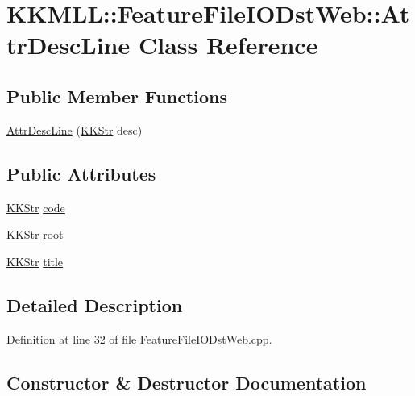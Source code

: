 \hypertarget{class_feature_file_i_o_dst_web_1_1_attr_desc_line}{}\section{K\+K\+M\+LL\+:\+:Feature\+File\+I\+O\+Dst\+Web\+:\+:Attr\+Desc\+Line Class Reference}
\label{class_feature_file_i_o_dst_web_1_1_attr_desc_line}
\subsection*{Public Member Functions}
\begin{DoxyCompactItemize}
\item 
\hyperlink{class_feature_file_i_o_dst_web_1_1_attr_desc_line_a5e8bac5bcba089fff2f6f1288db45661}{Attr\+Desc\+Line} (\hyperlink{class_k_k_b_1_1_k_k_str}{K\+K\+Str} desc)
\end{DoxyCompactItemize}
\subsection*{Public Attributes}
\begin{DoxyCompactItemize}
\item 
\hyperlink{class_k_k_b_1_1_k_k_str}{K\+K\+Str} \hyperlink{class_feature_file_i_o_dst_web_1_1_attr_desc_line_a95a0f1eedd7d8b881b40b57b4d0d8eba}{code}
\item 
\hyperlink{class_k_k_b_1_1_k_k_str}{K\+K\+Str} \hyperlink{class_feature_file_i_o_dst_web_1_1_attr_desc_line_a1b113dcf30d429e6a0db6042df2e9b51}{root}
\item 
\hyperlink{class_k_k_b_1_1_k_k_str}{K\+K\+Str} \hyperlink{class_feature_file_i_o_dst_web_1_1_attr_desc_line_a04afb7863f4c0ebd681c503e42a52c3b}{title}
\end{DoxyCompactItemize}


\subsection{Detailed Description}


Definition at line 32 of file Feature\+File\+I\+O\+Dst\+Web.\+cpp.



\subsection{Constructor \& Destructor Documentation}
